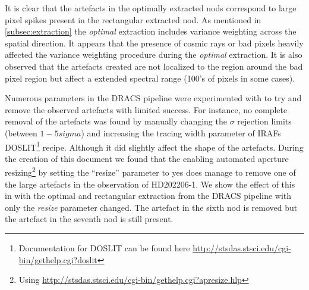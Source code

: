 It is clear that the artefacts in the optimally extracted nods correspond to large pixel spikes present in the rectangular extracted nod. As mentioned in \ref{subsec:extraction} the \emph{optimal} extraction includes variance weighting across the spatial direction. It appears that the presence of cosmic rays or bad pixels heavily affected the variance weighting procedure during the \emph{optimal} extraction. It is also observed that the artefacts created are not localized to the region around the bad pixel region but affect a extended spectral range (100's of pixels in some cases).

Numerous parameters in the DRACS pipeline were experimented with to try and remove the observed artefacts with limited success. For instance, no complete removal of the artefacts was found by manually changing the \(\sigma\) rejection limits (between \(1-5 sigma\)) and increasing the tracing width parameter of IRAFs DOSLIT\footnote{Documentation for DOSLIT can be found here \href{http://stsdas.stsci.edu/cgi-bin/gethelp.cgi?doslit}{http://stsdas.stsci.edu/cgi-bin/gethelp.cgi?doslit}} recipe. Although it did slightly affect the shape of the artefacts.
During the creation of this document we found that the enabling automated aperture resizing\footnote{Using \href{apresize}{http://stsdas.stsci.edu/cgi-bin/gethelp.cgi?apresize.hlp}} by setting the ``resize'' parameter to yes does manage to remove one of the large artefacts in the observation of {HD202206-1}. We show the effect of this in  with the optimal and rectangular extraction from the DRACS pipeline with only the \emph{resize} parameter changed. The artefact in the sixth nod is removed but the artefact in the seventh nod is still present.
